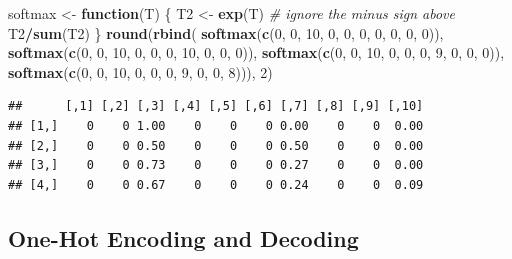 \documentclass[10pt,b5paper,krantz1]{krantz}
\newenvironment{Shaded}{\begin{snugshade}}{\end{snugshade}}
\newcommand{\CommentTok}[1]{\textcolor[rgb]{0.37,0.37,0.37}{\textit{#1}}}
\newcommand{\ControlFlowTok}[1]{\textcolor[rgb]{0.27,0.27,0.27}{\textbf{#1}}}
\newcommand{\DecValTok}[1]{\textcolor[rgb]{0.06,0.06,0.06}{#1}}
\newcommand{\KeywordTok}[1]{\textcolor[rgb]{0.27,0.27,0.27}{\textbf{#1}}}
\newcommand{\NormalTok}[1]{#1}
\newcommand{\OperatorTok}[1]{\textcolor[rgb]{0.43,0.43,0.43}{\textbf{#1}}}
\newcommand{\StringTok}[1]{\textcolor[rgb]{0.5,0.5,0.5}{#1}}
\begin{document}
\begin{Shaded}
\begin{Highlighting}[]
\NormalTok{softmax <-}\StringTok{ }\ControlFlowTok{function}\NormalTok{(T) \{}
\NormalTok{    T2 <-}\StringTok{ }\KeywordTok{exp}\NormalTok{(T) }\CommentTok{# ignore the minus sign above}
\NormalTok{    T2}\OperatorTok{/}\KeywordTok{sum}\NormalTok{(T2)}
\NormalTok{\}}
\KeywordTok{round}\NormalTok{(}\KeywordTok{rbind}\NormalTok{(}
    \KeywordTok{softmax}\NormalTok{(}\KeywordTok{c}\NormalTok{(}\DecValTok{0}\NormalTok{, }\DecValTok{0}\NormalTok{, }\DecValTok{10}\NormalTok{, }\DecValTok{0}\NormalTok{, }\DecValTok{0}\NormalTok{, }\DecValTok{0}\NormalTok{, }\DecValTok{0}\NormalTok{,  }\DecValTok{0}\NormalTok{, }\DecValTok{0}\NormalTok{, }\DecValTok{0}\NormalTok{)),}
    \KeywordTok{softmax}\NormalTok{(}\KeywordTok{c}\NormalTok{(}\DecValTok{0}\NormalTok{, }\DecValTok{0}\NormalTok{, }\DecValTok{10}\NormalTok{, }\DecValTok{0}\NormalTok{, }\DecValTok{0}\NormalTok{, }\DecValTok{0}\NormalTok{, }\DecValTok{10}\NormalTok{, }\DecValTok{0}\NormalTok{, }\DecValTok{0}\NormalTok{, }\DecValTok{0}\NormalTok{)),}
    \KeywordTok{softmax}\NormalTok{(}\KeywordTok{c}\NormalTok{(}\DecValTok{0}\NormalTok{, }\DecValTok{0}\NormalTok{, }\DecValTok{10}\NormalTok{, }\DecValTok{0}\NormalTok{, }\DecValTok{0}\NormalTok{, }\DecValTok{0}\NormalTok{, }\DecValTok{9}\NormalTok{,  }\DecValTok{0}\NormalTok{, }\DecValTok{0}\NormalTok{, }\DecValTok{0}\NormalTok{)),}
    \KeywordTok{softmax}\NormalTok{(}\KeywordTok{c}\NormalTok{(}\DecValTok{0}\NormalTok{, }\DecValTok{0}\NormalTok{, }\DecValTok{10}\NormalTok{, }\DecValTok{0}\NormalTok{, }\DecValTok{0}\NormalTok{, }\DecValTok{0}\NormalTok{, }\DecValTok{9}\NormalTok{,  }\DecValTok{0}\NormalTok{, }\DecValTok{0}\NormalTok{, }\DecValTok{8}\NormalTok{))), }\DecValTok{2}\NormalTok{)}
\end{Highlighting}
\end{Shaded}

\begin{verbatim}
##      [,1] [,2] [,3] [,4] [,5] [,6] [,7] [,8] [,9] [,10]
## [1,]    0    0 1.00    0    0    0 0.00    0    0  0.00
## [2,]    0    0 0.50    0    0    0 0.50    0    0  0.00
## [3,]    0    0 0.73    0    0    0 0.27    0    0  0.00
## [4,]    0    0 0.67    0    0    0 0.24    0    0  0.09
\end{verbatim}

\hypertarget{one-hot-encoding-and-decoding}{%
\subsection{One-Hot Encoding and Decoding}\label{one-hot-encoding-and-decoding}}
\end{document}
